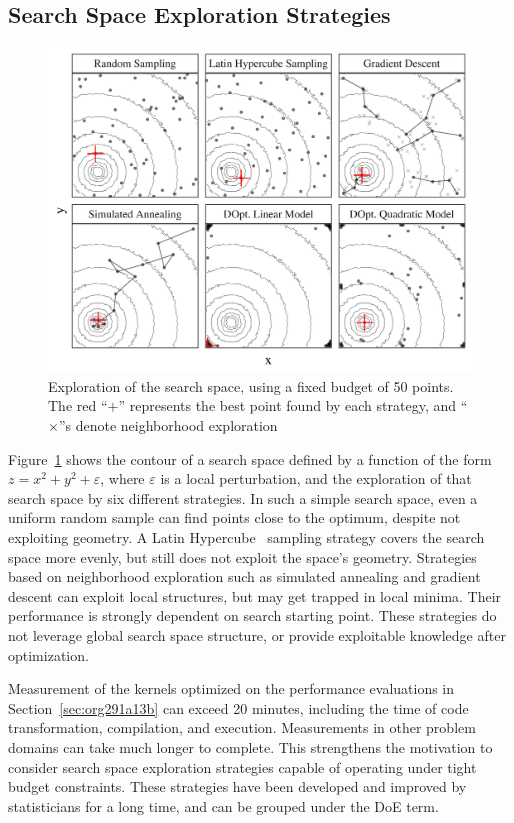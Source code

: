 \documentclass[conference]{IEEEtran}
\begin{document}
\subsection{Search Space Exploration Strategies}
\label{sec:org8de3220}
\begin{figure}[b]
\centering
\includegraphics[width=.95\columnwidth]{./img/sampling_comparison.pdf}
\caption{\label{fig:orgccc4a37}
Exploration of the search space, using a fixed budget of 50 points. The red ``\(+\)'' represents the best point found by each strategy, and ``\(\times\)''s denote neighborhood exploration}
\end{figure}

Figure~\ref{fig:orgccc4a37} shows the contour of  a search space defined by a
function of the form \(z  = x^2 + y^2 + \varepsilon\), where \(\varepsilon\)  is a local perturbation, and
the exploration  of that  search space  by six different  strategies. In  such a
simple search space, even  a uniform random sample can find  points close to the
optimum,      despite      not       exploiting      geometry.      A      Latin
Hypercube~\cite{carnell2018lhs} sampling  strategy covers the search  space more
evenly, but  still does not  exploit the  space's geometry. Strategies  based on
neighborhood exploration  such as simulated  annealing and gradient  descent can
exploit local structures, but may get trapped in local minima. Their performance
is strongly dependent on search starting point. These strategies do not leverage
global  search   space  structure,   or  provide  exploitable   knowledge  after
optimization.

Measurement  of  the  kernels  optimized   on  the  performance  evaluations  in
Section~\ref{sec:org291a13b} can exceed 20 minutes, including the time of code
transformation,  compilation,  and  execution.  Measurements  in  other  problem
domains can  take much longer  to complete.  This strengthens the  motivation to
consider search  space exploration strategies  capable of operating  under tight
budget  constraints.  These  strategies  have been  developed  and  improved  by
statisticians for a long time, and can be grouped under the DoE term.
\end{document}
